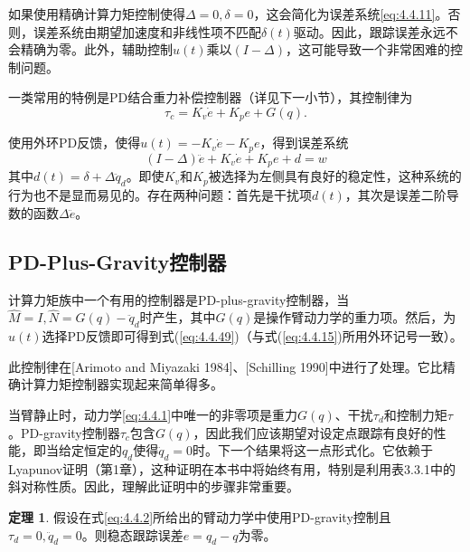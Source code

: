 \documentclass[UTF8]{ctexart}
\theoremstyle{definition}
\newtheorem{theorem}{定理}[section]
\begin{document}
如果使用精确计算力矩控制使得$\Delta = 0, \delta = 0$，这会简化为误差系统\eqref{eq:4.4.11}。否则，误差系统由期望加速度和非线性项不匹配$\delta(t)$驱动。因此，跟踪误差永远不会精确为零。此外，辅助控制$u(t)$乘以$(I - \Delta)$，这可能导致一个非常困难的控制问题。

一类常用的特例是PD结合重力补偿控制器（详见下一小节），其控制律为
\begin{equation}\label{eq:4.4.49}
    \tau_c = K_v\dot{e} + K_pe + G(q).
\end{equation}

使用外环PD反馈，使得$u(t) = -K_v\dot{e} - K_pe$，得到误差系统
\begin{equation}\label{eq:4.4.50}
    (I - \Delta)\ddot{e} + K_v\dot{e} + K_pe + d = w
\end{equation}
其中$d(t) = \delta + \Delta\ddot{q}_d$。即使$K_v$和$K_p$被选择为左侧具有良好的稳定性，这种系统的行为也不是显而易见的。存在两种问题：首先是干扰项$d(t)$，其次是误差二阶导数的函数$\Delta\ddot{e}$。

\subsection{PD-Plus-Gravity控制器}

计算力矩族中一个有用的控制器是PD-plus-gravity控制器，当$\hat{M} = I, \hat{N} = G(q) - \ddot{q}_d$时产生，其中$G(q)$是操作臂动力学的重力项。然后，为$u(t)$选择PD反馈即可得到式(\ref{eq:4.4.49})（与式(\ref{eq:4.4.15})所用外环记号一致）。

此控制律在[Arimoto and Miyazaki 1984]、[Schilling 1990]中进行了处理。它比精确计算力矩控制器实现起来简单得多。

当臂静止时，动力学\eqref{eq:4.4.1}中唯一的非零项是重力$G(q)$、干扰$\tau_d$和控制力矩$\tau$。PD-gravity控制器$\tau_c$包含$G(q)$，因此我们应该期望对设定点跟踪有良好的性能，即当给定恒定的$q_d$使得$\ddot{q}_d = 0$时。下一个结果将这一点形式化。它依赖于Lyapunov证明（第1章），这种证明在本书中将始终有用，特别是利用表3.3.1中的斜对称性质。因此，理解此证明中的步骤非常重要。

\begin{theorem}
假设在式\eqref{eq:4.4.2}所给出的臂动力学中使用PD-gravity控制且$\tau_d = 0, \ddot{q}_d = 0$。则稳态跟踪误差$e = q_d - q$为零。
\end{theorem}
\end{document}
